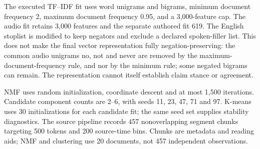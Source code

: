 The executed TF--IDF fit uses word unigrams and bigrams, minimum document frequency 2, maximum document frequency 0.95, and a 3,000-feature cap. The audio fit retains 3,000 features and the separate authored fit 619. The English stoplist is modified to keep negators and exclude a declared spoken-filler list. This does not make the final vector representation fully negation-preserving: the common audio unigrams no, not and never are removed by the maximum-document-frequency rule, and nor by the minimum rule; some negated bigrams can remain. The representation cannot itself establish claim stance or agreement.

NMF uses random initialization, coordinate descent and at most 1,500 iterations. Candidate component counts are 2--6, with seeds 11, 23, 47, 71 and 97. K-means uses 30 initializations for each candidate fit; the same seed set supplies stability diagnostics. The source pipeline records 457 nonoverlapping segment chunks targeting 500 tokens and 200 source-time bins. Chunks are metadata and reading aids; NMF and clustering use 20 documents, not 457 independent observations.
